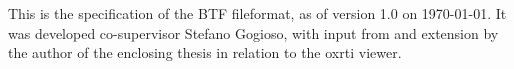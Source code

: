 \newpage
\appendix
This is the specification of the BTF fileformat, as of version 1.0 on \today.
It was developed co-supervisor Stefano Gogioso, with input from and extension by
the author of the enclosing thesis in relation to the oxrti viewer.

\newpage
\printbibliography

